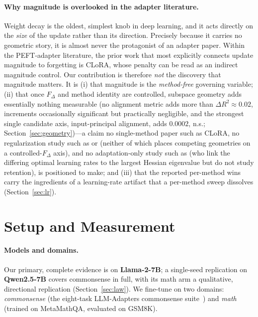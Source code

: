 \documentclass[11pt]{article}
\newcommand{\dw}{F_{\Delta}}
\begin{document}
\paragraph{Why magnitude is overlooked in the adapter literature.} Weight decay is
the oldest, simplest knob in deep learning, and it acts directly on the \emph{size}
of the update rather than its direction. Precisely because it carries no geometric
story, it is almost never the protagonist of an adapter paper. Within the
PEFT-adapter literature, the prior work that most explicitly connects update
magnitude to forgetting is CLoRA, whose penalty can be read as an indirect
magnitude control. Our contribution is therefore \emph{not} the discovery that
magnitude matters. It is (i) that magnitude is the \emph{method-free} governing
variable; (ii) that once $\dw$ and method identity are controlled, subspace
geometry adds essentially nothing measurable (no alignment metric adds more than
$\Delta R^2\!\approx\!0.02$, increments occasionally significant but practically
negligible, and the strongest single candidate axis, input-principal alignment,
adds $0.0002$, n.s.; Section~\ref{sec:geometry})---a
claim no single-method paper such as CLoRA, no
regularization study such as \citet{biderman2024lora} or
\citet{kalajdzievski2024scaling} (neither of which places competing geometries on
a controlled-$\dw$ axis), and no adaptation-only study such as \citet{lee2026lr}
(who link the differing optimal learning rates to the largest Hessian eigenvalue
but do not study retention), is positioned to make; and (iii) that the reported
per-method wins carry the ingredients of a learning-rate artifact that a
per-method sweep dissolves (Section~\ref{sec:lr}).

\section{Setup and Measurement}\label{sec:setup}
\paragraph{Models and domains.} Our primary, complete evidence is on
\textbf{Llama-2-7B}; a single-seed replication on \textbf{Qwen2.5-7B} covers
commonsense in full, with its math arm a qualitative, directional replication
(Section~\ref{sec:law}). We fine-tune
on two domains: \emph{commonsense} (the eight-task LLM-Adapters commonsense
suite~\citep{hu2023llmadapters}) and \emph{math} (trained on MetaMathQA, evaluated
on GSM8K).
\end{document}
